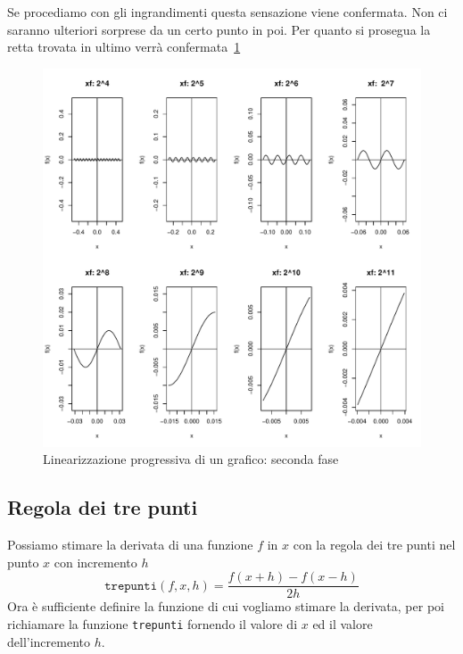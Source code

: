 \documentclass[onecolumn,11pt]{book}\usepackage[]{graphicx}\usepackage[]{color}
\makeatletter
\def\maxwidth{ %
  \ifdim\Gin@nat@width>\linewidth
    \linewidth
  \else
    \Gin@nat@width
  \fi
}
\newenvironment{knitrout}{}{} %
\makeatother
\begin{document}
Se procediamo con gli ingrandimenti  questa sensazione viene confermata.
Non ci saranno ulteriori sorprese da un certo punto in poi.
Per quanto si prosegua la retta trovata in ultimo verr\`a confermata~\ref{fig:linearizzazione4}

\begin{figure}[h]
\begin{knitrout}
\color{fgcolor}
\includegraphics[width=\maxwidth]{figure/unnamed-chunk-114-1} 

\end{knitrout}
\caption{Linearizzazione progressiva di un grafico: seconda fase}
\label{fig:linearizzazione4}
\end{figure}
 \subsection{Regola dei tre punti}
Possiamo stimare la derivata di una funzione $f$ in $x$ con la regola dei tre punti nel punto $x$ con incremento $h$
$$
\texttt{trepunti}(f,x,h)=\frac{f(x+h)-f(x-h)}{2h}
$$
Ora \`e sufficiente definire la funzione di cui vogliamo stimare la derivata, per poi richiamare la funzione \texttt{trepunti} fornendo il valore di $x$ ed il valore dell'incremento $h$.
\end{document}
